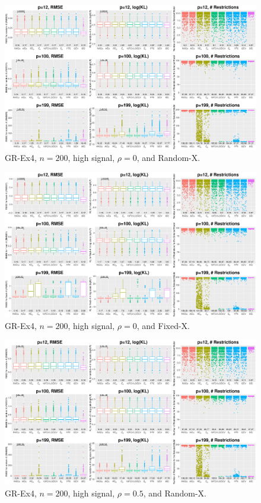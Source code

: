 \clearpage
\begin{figure}[!ht]
\centering
\includegraphics[width=\textwidth]{figures/supplement/randomx_GR-Ex4_n200_hsnr_rho0.eps}
\caption{GR-Ex4, $n=200$, high signal, $\rho=0$, and Random-X.}
\end{figure}
\begin{figure}[!ht]
\centering
\includegraphics[width=\textwidth]{figures/supplement/fixedx_GR-Ex4_n200_hsnr_rho0.eps}
\caption{GR-Ex4, $n=200$, high signal, $\rho=0$, and Fixed-X.}
\end{figure}
\clearpage
\begin{figure}[!ht]
\centering
\includegraphics[width=\textwidth]{figures/supplement/randomx_GR-Ex4_n200_hsnr_rho05.eps}
\caption{GR-Ex4, $n=200$, high signal, $\rho=0.5$, and Random-X.}
\end{figure}
